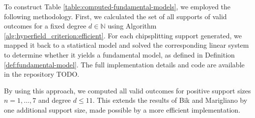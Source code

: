 To construct Table \ref{table:computed-fundamental-models}, we employed the following methodology. First, we calculated the set of all supports of valid outcomes for a fixed degree \( d\in \mathbb{N} \) using Algorithm \ref{alg:hyperfield_criterion:efficient}. For each chipsplitting support generated, we mapped it back to a statistical model and solved the corresponding linear system to determine whether it yields a fundamental model, as defined in Definition \ref{def:fundamental-model}. The full implementation details and code are available in the repository TODO.

By using this approach, we computed all valid outcomes for positive support sizes \( n = 1, \dots, 7 \) and degree \( d \leq 11 \). This extends the results of Bik and Marigliano \cite{bik2022classifying} by one additional support size, made possible by a more efficient implementation.
